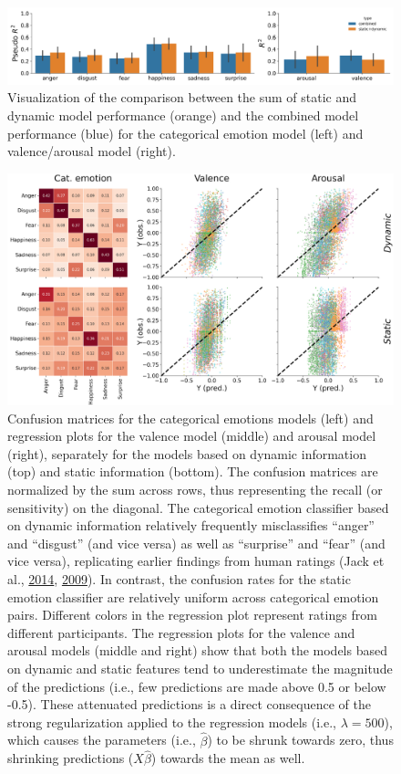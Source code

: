 \documentclass[11pt,american,a4paper,oneside,]{memoir} %
\begin{document}
\begin{figure}
\centering
\includegraphics{_bookdown_files/static-vs-dynamic-files/figures/figure_S4.pdf}
\caption{\label{fig:fig-svsd-S4}Visualization of the comparison between the sum of static and dynamic model performance (orange) and the combined model performance (blue) for the categorical emotion model (left) and valence/arousal model (right).}
\end{figure}



\begin{figure}
\centering
\includegraphics{_bookdown_files/static-vs-dynamic-files/figures/figure_S5.pdf}
\caption{\label{fig:fig-svsd-S5}Confusion matrices for the categorical emotions models (left) and regression plots for the valence model (middle) and arousal model (right), separately for the models based on dynamic information (top) and static information (bottom). The confusion matrices are normalized by the sum across rows, thus representing the recall (or sensitivity) on the diagonal. The categorical emotion classifier based on dynamic information relatively frequently misclassifies ``anger'' and ``disgust'' (and vice versa) as well as ``surprise'' and ``fear'' (and vice versa), replicating earlier findings from human ratings (Jack et al., \protect\hyperlink{ref-Jack2014-ku}{2014}, \protect\hyperlink{ref-Jack2009-yy}{2009}). In contrast, the confusion rates for the static emotion classifier are relatively uniform across categorical emotion pairs. Different colors in the regression plot represent ratings from different participants. The regression plots for the valence and arousal models (middle and right) show that both the models based on dynamic and static features tend to underestimate the magnitude of the predictions (i.e., few predictions are made above 0.5 or below -0.5). These attenuated predictions is a direct consequence of the strong regularization applied to the regression models (i.e., \(\lambda = 500\)), which causes the parameters (i.e., \(\hat{\beta}\)) to be shrunk towards zero, thus shrinking predictions (\(X\hat{\beta}\)) towards the mean as well.}
\end{figure}
\end{document}
